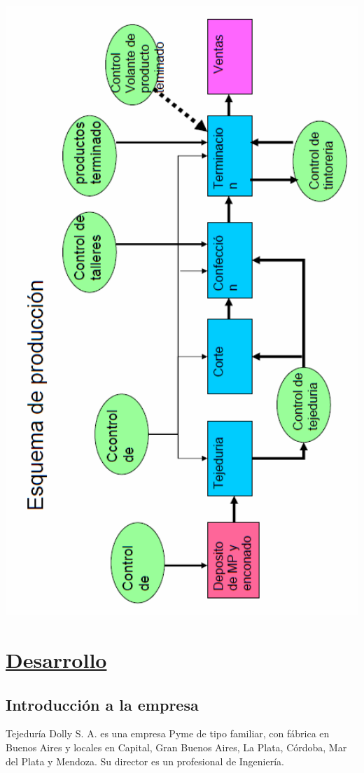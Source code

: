 \documentclass[a4paper,12pt,titlepage]{article}
\begin{document}
\includegraphics[width=400pt]{./esquemaproduccionDolly.png}



\newpage
\section{\underline{Desarrollo}}
	\subsection {Introducci\'{o}n a la empresa}
	Tejedur\'{i}a Dolly S. A. es una empresa Pyme de tipo familiar, con f\'{a}brica en Buenos Aires y locales en Capital, Gran Buenos Aires, La Plata, C\'{o}rdoba, Mar del Plata y Mendoza. Su director es un profesional de Ingenier\'{i}a.\\
	
\end{document}
